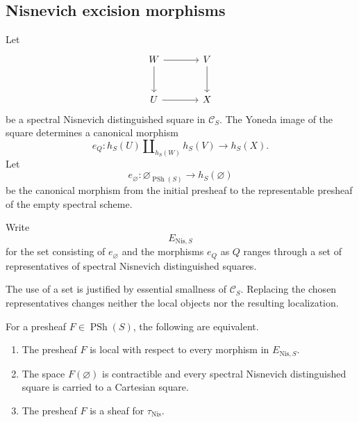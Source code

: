 \subsection{Nisnevich excision morphisms}

\begin{construction}
\label{con:nisnevich-excision-morphisms}
Let
\[
\begin{tikzcd}[column sep=large, row sep=large]
    W
        \arrow[r]
        \arrow[d]
    &
    V
        \arrow[d]
    \\
    U
        \arrow[r]
    &
    X
\end{tikzcd}
\]
be a spectral Nisnevich distinguished square in \(\mathcal C_S\).  The
Yoneda image of the square determines a canonical morphism
\[
    e_Q
    \colon
    h_S(U)
    \amalg_{h_S(W)}
    h_S(V)
    \longrightarrow
    h_S(X).
\]
Let
\[
    e_{\varnothing}
    \colon
    \varnothing_{\operatorname{PSh}(S)}
    \longrightarrow
    h_S(\varnothing)
\]
be the canonical morphism from the initial presheaf to the representable
presheaf of the empty spectral scheme.

Write
\[
    E_{\mathrm{Nis},S}
\]
for the set consisting of \(e_{\varnothing}\) and the morphisms \(e_Q\)
as \(Q\) ranges through a set of representatives of spectral Nisnevich
distinguished squares.
\end{construction}

The use of a set is justified by essential smallness of
\(\mathcal C_S\).  Replacing the chosen representatives changes neither
the local objects nor the resulting localization.

\begin{proposition}
\label{prop:nisnevich-local-objects}
For a presheaf \(F\in\operatorname{PSh}(S)\), the following are
equivalent.
\begin{enumerate}[label=(\roman*)]
    \item The presheaf \(F\) is local with respect to every morphism in
    \(E_{\mathrm{Nis},S}\).

    \item The space \(F(\varnothing)\) is contractible and every spectral
    Nisnevich distinguished square is carried to a Cartesian square.

    \item The presheaf \(F\) is a sheaf for
    \(\tau_{\mathrm{Nis}}\).
\end{enumerate}
\end{proposition}

